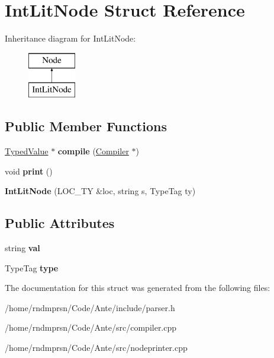 \hypertarget{structIntLitNode}{}\section{Int\+Lit\+Node Struct Reference}
\label{structIntLitNode}
Inheritance diagram for Int\+Lit\+Node\+:\begin{figure}[H]
\begin{center}
\leavevmode
\includegraphics[height=2.000000cm]{structIntLitNode}
\end{center}
\end{figure}
\subsection*{Public Member Functions}
\begin{DoxyCompactItemize}
\item 
\mbox{\label{structIntLitNode_a1b0e998c4ebf5aea3da4e249bc909525}} 
\hyperlink{structTypedValue}{Typed\+Value} $\ast$ {\bfseries compile} (\hyperlink{structante_1_1Compiler}{Compiler} $\ast$)
\item 
\mbox{\label{structIntLitNode_a7a6a5e60f242cc9b3fd4b7664aeb038b}} 
void {\bfseries print} ()
\item 
\mbox{\label{structIntLitNode_a0950e60771f18bf7ad9559d227d78dae}} 
{\bfseries Int\+Lit\+Node} (L\+O\+C\+\_\+\+TY \&loc, string s, Type\+Tag ty)
\end{DoxyCompactItemize}
\subsection*{Public Attributes}
\begin{DoxyCompactItemize}
\item 
\mbox{\label{structIntLitNode_ae9bcdf0d1a64b218ef41c5d2251bc2b0}} 
string {\bfseries val}
\item 
\mbox{\label{structIntLitNode_a3f0629739a64eee72539458b4dd48ffd}} 
Type\+Tag {\bfseries type}
\end{DoxyCompactItemize}


The documentation for this struct was generated from the following files\+:\begin{DoxyCompactItemize}
\item 
/home/rndmprsn/\+Code/\+Ante/include/parser.\+h\item 
/home/rndmprsn/\+Code/\+Ante/src/compiler.\+cpp\item 
/home/rndmprsn/\+Code/\+Ante/src/nodeprinter.\+cpp\end{DoxyCompactItemize}

